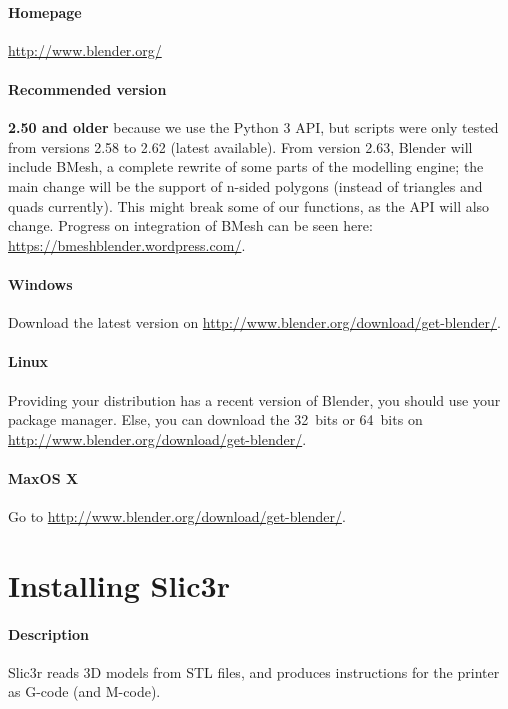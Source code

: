 \documentclass{article}
\begin{document}
	\paragraph{Homepage} \url{http://www.blender.org/}

	\paragraph{Recommended version} \textbf{2.50 and older} because we use the Python 3 API, but scripts were only tested from versions 2.58 to 2.62 (latest available). From version 2.63, Blender will include BMesh, a complete rewrite of some parts of the modelling engine; the main change will be the support of n-sided polygons (instead of triangles and quads currently). This might break some of our functions, as the API will also change. Progress on integration of BMesh can be seen here: \url{https://bmeshblender.wordpress.com/}.

	\paragraph{Windows} Download the latest version on \url{http://www.blender.org/download/get-blender/}.

	\paragraph{Linux} Providing your distribution has a recent version of Blender, you should use your package manager. Else, you can download the 32~bits or 64~bits on \url{http://www.blender.org/download/get-blender/}.

	\paragraph{MaxOS X} Go to \url{http://www.blender.org/download/get-blender/}. %

\newpage

\section{Installing Slic3r}

	\paragraph{Description} Slic3r reads 3D models from STL files, and produces instructions for the printer as G-code (and M-code).
\end{document}
